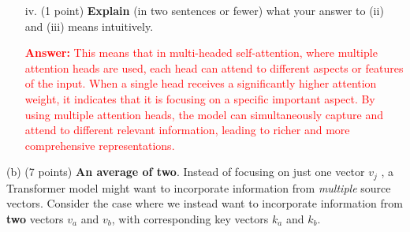 \documentclass[letterpaper,12pt]{article}
\begin{document}
		\begin{itemize}
			\item [iv.]
			(1 point) \textbf{Explain} (in two sentences or fewer) what your answer to (ii) and (iii) means intuitively.
			
			\textcolor{red}{\textbf{Answer:} This means that in multi-headed self-attention, where multiple attention heads are used, each head can attend to different aspects or features of the input. When a single head receives a significantly higher attention weight, it indicates that it is focusing on a specific important aspect. By using multiple attention heads, the model can simultaneously capture and attend to different relevant information, leading to richer and more comprehensive representations.}
		\end{itemize}	
		
	\noindent(b) (7 points) \textbf{An average of two}. Instead of focusing on just one vector $v_j$ , a Transformer model might want to incorporate information from \textit{multiple} source vectors. Consider the case where we instead want to incorporate information from \textbf{two} vectors $v_a$ and $v_b$, with corresponding key vectors $k_a$ and $k_b$.
	
\end{document}
